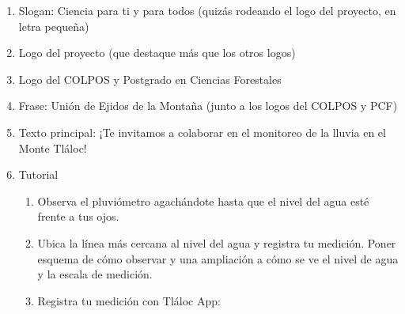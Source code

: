 \begin{enumerate}
\begin{enumerate}
        \item Slogan: 
        Ciencia para ti y para todos (quizás rodeando el logo del proyecto, en letra pequeña)
        \item Logo del proyecto (que destaque más que los otros logos)
        \item Logo del COLPOS y Postgrado en Ciencias Forestales
        \item Frase: Unión de Ejidos de la Montaña (junto a los logos del COLPOS y PCF)
        \item Texto principal: ¡Te invitamos a colaborar en el monitoreo de la lluvia en el Monte Tláloc!
        \item Tutorial \begin{enumerate}
            \item Observa el pluviómetro agachándote hasta que el nivel del agua esté frente a tus ojos. 
            \item Ubica la línea más cercana al nivel del agua y registra tu medición. 
            Poner esquema de cómo observar y una ampliación a cómo se ve el nivel de agua y la escala de medición.
            \item Registra tu medición con Tláloc App:
            

\end{enumerate}
\end{enumerate}
\end{enumerate}

